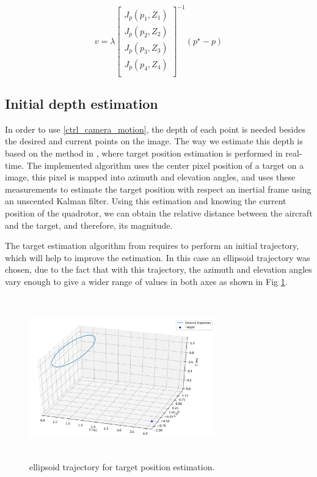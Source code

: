 \documentclass[conference]{IEEEtran}
\begin{document}
\begin{equation}
v = \lambda \left[ \begin{matrix} J_{p}(p_{1},Z_{1}) \\ J_{p}(p_{2},Z_{2}) \\ J_{p}(p_{3},Z_{3}) \\ J_{p}(p_{4},Z_{4}) \\ \end{matrix} \right]^{-1} (p^{\star} - p) \label{ctrl_camera_motion}
\end{equation}

\subsection{Initial depth estimation}
In order to use \eqref{ctrl_camera_motion}, the depth of each point is needed besides the desired and current points on the image. The way we estimate this depth is based on the method in \cite{DenaRuiz2017_2}, where target position estimation is performed in real-time. The implemented algorithm uses the center pixel position of a target on a image, this pixel is mapped into azimuth and elevation angles, and uses these measurements to estimate the target position with respect an inertial frame using an unscented Kalman filter. Using this estimation and knowing the current position of the quadrotor, we can obtain the relative distance between the aircraft and the target, and therefore, its magnitude.

The target estimation algorithm from \cite{DenaRuiz2017_2} requires to perform an initial trajectory, which will help to improve the estimation. In this case an ellipsoid trajectory was chosen, due to the fact that with this trajectory, the azimuth and elevation angles vary enough to give a wider range of values in both axes as shown in Fig \ref{ellipsoid_traj}.

\begin{figure}
\centering
\includegraphics[width=8.0cm, height=7cm]{Images/3D_est_trajectory.png}
\caption{ellipsoid trajectory for target position estimation.}
\label{ellipsoid_traj}
\end{figure}
\end{document}
